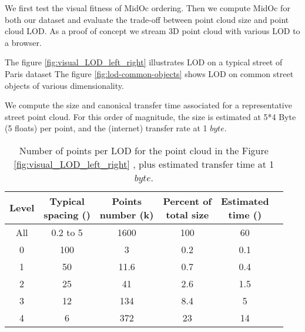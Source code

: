 		
		We first test the visual fitness of MidOc ordering.
		Then we compute MidOc for both our dataset and evaluate the trade-off between point cloud size and point cloud LOD. 
		As a proof of concept we stream 3D point cloud with various LOD to a browser.
		
		The figure \ref{fig:visual_LOD_left_right} illustrates LOD on a typical street of Paris dataset
		The figure \ref{fig:lod-common-objects} shows LOD on common street objects of various dimensionality.
			  
		We compute the size and canonical transfer time associated for a representative street point cloud.
		For this order of magnitude, the size is estimated at 5*4 Byte (5 floats) per point, and the (internet) transfer rate at 1 \mega $byte$\per \second.
		
		\begin{table}[ht]
			\centering
			\caption{Number of points per LOD for the point cloud in the Figure \ref{fig:visual_LOD_left_right}
				, plus estimated transfer time at 1 \mega $byte$\per \second.}
			\label{tab:lod-size-time}
			\scriptsize 
			\begin{tabular}{cccccc}
				\bf{Level} & \shortstack{\bf{Typical} \\ \bf{spacing (\centi \meter)}} & \shortstack{ \bf{Points} \\ \bf{number (k)}} & \shortstack{\bf{Percent of} \\ \bf{total size}} & \shortstack{\bf{Estimated} \\ \bf{time (\second)}}   \\
				\hline All & 0.2 to 5  & 1600 & 100 & 60 \\ 
				\hline 0 & 100 & 3 & 0.2 & 0.1 \\ 
				\hline 1 & 50 & 11.6 & 0.7 & 0.4 \\ 
				\hline 2 & 25 & 41 & 2.6 & 1.5 \\ 
				\hline 3 & 12 & 134 & 8.4 & 5 \\ 
				\hline 4 & 6 & 372 & 23 & 14 \\    
			\end{tabular} 
		\end{table}
			 
